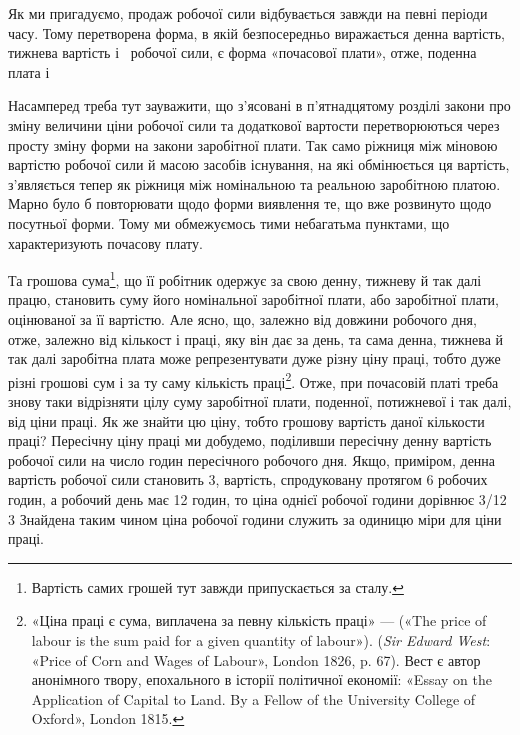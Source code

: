 Як ми пригадуємо, продаж робочої сили відбувається завжди
на певні періоди часу. Тому перетворена форма, в якій безпосередньо
виражається денна вартість, тижнева вартість і~ робочої
сили, є форма «почасової плати», отже, поденна плата і~

Насамперед треба тут зауважити, що з’ясовані в п’ятнадцятому
розділі закони про зміну величини ціни робочої сили та додаткової
вартости перетворюються через просту зміну форми
на закони заробітної плати. Так само ріжниця між міновою вартістю
робочої сили й масою засобів існування, на які обмінюється
ця вартість, з’являється тепер як ріжниця між номінальною та
реальною заробітною платою. Марно було б повторювати щодо
форми виявлення те, що вже розвинуто щодо посутньої форми.
Тому ми обмежуємось тими небагатьма пунктами, що характеризують
почасову плату.

Та грошова сума\footnote{
Вартість самих грошей тут завжди припускається за сталу.
}, що її робітник одержує за свою денну,
тижневу й так далі працю, становить суму його номінальної
заробітної плати, або заробітної плати, оцінюваної за її вартістю.
Але ясно, що, залежно від довжини робочого дня, отже,
залежно від кількост і праці, яку він дає за день, та сама денна,
тижнева й так далі заробітна плата може репрезентувати дуже
різну ціну праці, тобто дуже різні грошові сум і за ту саму кількість
праці\footnote{
«Ціна праці є сума, виплачена за певну кількість праці» — («The
price of labour is the sum paid for a given quantity of labour»).
(\emph{Sir Edward West}: «Price of Corn and Wages of Labour», London 1826,
p. 67). Вест є автор анонімного твору, епохального в історії політичної економії:
«Essay on the Application of Capital to Land. By a Fellow of the
University College of Oxford», London 1815.
}. Отже, при почасовій платі треба знову таки відрізняти
цілу суму заробітної плати, поденної, потижневої і так
далі, від ціни праці. Як же знайти цю ціну, тобто грошову вартість
даної кількости праці? Пересічну ціну праці ми добудемо,
поділивши пересічну денну вартість робочої сили на число годин
пересічного робочого дня. Якщо, приміром, денна вартість
робочої сили становить 3, вартість, спродуковану протягом
6 робочих годин, а робочий день має 12 годин, то ціна однієї
робочої години дорівнює 3/12 \deq{} 3 Знайдена
таким чином ціна робочої години служить за одиницю міри для
ціни праці.

